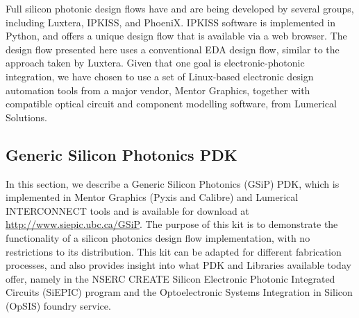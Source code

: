 \documentclass[journal]{spie}
\begin{document}
Full silicon photonic design flows have and are being developed by several groups, including Luxtera, IPKISS, and PhoeniX.  IPKISS software is implemented in Python, and offers a unique design flow that is available via a web browser.  The design flow presented here uses  a conventional EDA design flow, similar to the approach taken by Luxtera.  Given that one goal is electronic-photonic integration, we have chosen to use a set of Linux-based electronic design automation tools from a major vendor, Mentor Graphics, together with compatible optical circuit and component modelling software, from Lumerical Solutions.


\subsection{Generic Silicon Photonics PDK}\label{GSiP}

In this section, we describe a Generic Silicon Photonics (GSiP) PDK, which is implemented in Mentor Graphics  (Pyxis and Calibre) and Lumerical INTERCONNECT tools and is available for download at \url{http://www.siepic.ubc.ca/GSiP}.  The purpose of this kit is to demonstrate the functionality of a silicon photonics design flow implementation, with no restrictions to its distribution.  This kit can be adapted for different fabrication processes, and also provides insight into what PDK and Libraries available today offer, %
namely in the NSERC CREATE Silicon Electronic Photonic Integrated Circuits (SiEPIC) program and the Optoelectronic Systems Integration in Silicon (OpSIS) foundry service. 
\end{document}
